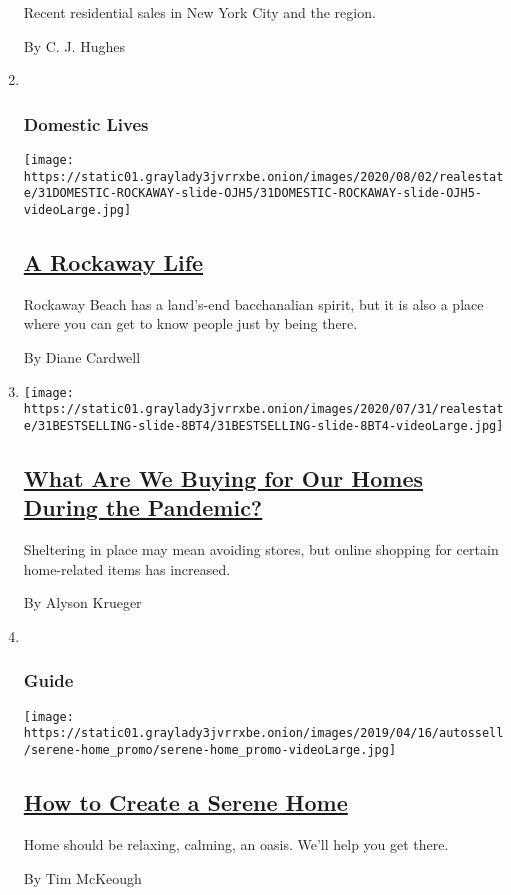 \begin{enumerate}
  Recent residential sales in New York City and the region.

  By C. J. Hughes
\item ~
  \hypertarget{domestic-lives}{%
  \subsubsection{Domestic Lives}\label{domestic-lives}}

  \texttt{[image: https://static01.graylady3jvrrxbe.onion/images/2020/08/02/realestate/31DOMESTIC-ROCKAWAY-slide-OJH5/31DOMESTIC-ROCKAWAY-slide-OJH5-videoLarge.jpg]}

  \hypertarget{a-rockaway-life}{%
  \subsection{\texorpdfstring{\href{/2020/07/31/realestate/a-rockaway-beach-queens-life.html}{A
  Rockaway Life}}{A Rockaway Life}}\label{a-rockaway-life}}

  Rockaway Beach has a land's-end bacchanalian spirit, but it is also a
  place where you can get to know people just by being there.

  By Diane Cardwell
\item
  \texttt{[image: https://static01.graylady3jvrrxbe.onion/images/2020/07/31/realestate/31BESTSELLING-slide-8BT4/31BESTSELLING-slide-8BT4-videoLarge.jpg]}

  \hypertarget{what-are-we-buying-for-our-homes-during-the-pandemic}{%
  \subsection{\texorpdfstring{\href{/2020/07/31/realestate/pandemic-shopping-home-design.html}{What
  Are We Buying for Our Homes During the
  Pandemic?}}{What Are We Buying for Our Homes During the Pandemic?}}\label{what-are-we-buying-for-our-homes-during-the-pandemic}}

  Sheltering in place may mean avoiding stores, but online shopping for
  certain home-related items has increased.

  By Alyson Krueger
\item ~
  \hypertarget{guide}{%
  \subsubsection{Guide}\label{guide}}

  \texttt{[image: https://static01.graylady3jvrrxbe.onion/images/2019/04/16/autossell/serene-home\_promo/serene-home\_promo-videoLarge.jpg]}

  \hypertarget{how-to-create-a-serene-home}{%
  \subsection{\texorpdfstring{\href{/interactive/2019/05/15/smarter-living/serene-home.html}{How
  to Create a Serene
  Home}}{How to Create a Serene Home}}\label{how-to-create-a-serene-home}}

  Home should be relaxing, calming, an oasis. We'll help you get there.

  By Tim McKeough
\end{enumerate}

